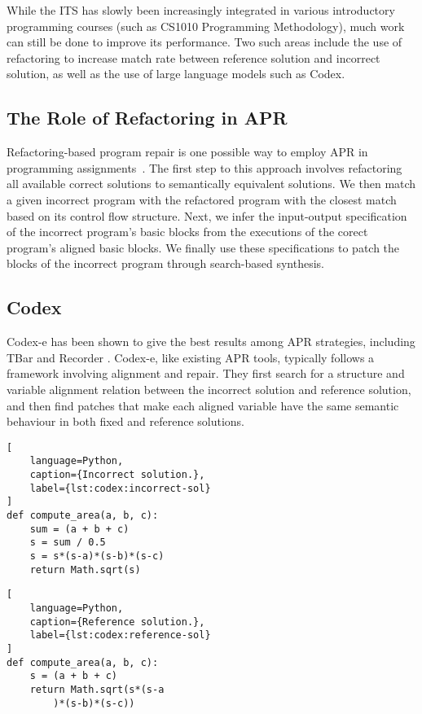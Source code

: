 While the ITS has slowly been increasingly integrated in various introductory
programming courses (such as CS1010 Programming Methodology), much work can still be done
to improve its performance.
Two such areas include the use of refactoring to increase match rate between reference
solution and incorrect solution, as well as the use of large language models such as Codex.

\subsection{The Role of Refactoring in APR}

Refactoring-based program repair is one possible way to employ APR in programming
assignments~\cite{hu2019re}.
The first step to this approach involves refactoring all available correct solutions to
semantically equivalent solutions.
We then match a given incorrect program with the refactored program with the closest match
based on its control flow structure.
Next, we infer the input-output specification of the incorrect program's basic blocks
from the executions of the corect program's aligned basic blocks.
We finally use these specifications to patch the blocks of the incorrect program through
search-based synthesis.

\subsection{Codex}
\label{background:codex}

Codex-e has been shown to give the best results among APR strategies, including TBar and Recorder
\cite{fan2022improving}.
Codex-e, like existing APR tools, typically follows a framework involving alignment and repair.
They first search for a structure and variable alignment relation between the incorrect solution
and reference solution, and then find patches that make each aligned variable have the same
semantic behaviour in both fixed and reference solutions.

\begin{multicols}{2}
\begin{lstlisting}[
    language=Python,
    caption={Incorrect solution.},
    label={lst:codex:incorrect-sol}
]
def compute_area(a, b, c):
    sum = (a + b + c)
    s = sum / 0.5
    s = s*(s-a)*(s-b)*(s-c)
    return Math.sqrt(s)
\end{lstlisting}

\columnbreak

\begin{lstlisting}[
    language=Python,
    caption={Reference solution.},
    label={lst:codex:reference-sol}
]
def compute_area(a, b, c):
    s = (a + b + c)
    return Math.sqrt(s*(s-a
        )*(s-b)*(s-c))
\end{lstlisting}
\end{multicols}

